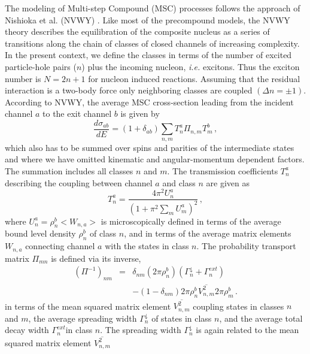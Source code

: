 \documentclass[twocolumn,amsmath,amssymb,10pt,groupedaddress,a4paper]{revtex4}
\begin{document}
The modeling of Multi-step Compound (MSC)
processes follows the approach of Nishioka et al. (NVWY)
\cite{NVWY}. Like most of the precompound models, the NVWY theory
describes the equilibration of the composite nucleus as a series of
transitions along the chain of classes of closed channels of increasing
complexity. In the present context, we define the classes in terms
of the number of excited particle-hole pairs ($n$) plus the incoming
nucleon, {\it i.e.} excitons. Thus the exciton number is $N=2n+1$ for nucleon
induced reactions. Assuming that the residual interaction is a two-body
force only neighboring classes are coupled $(\Delta n=\pm1)$.
According to NVWY, the average MSC cross-section
leading from the incident channel $a$ to the exit channel $b$ is
given by
\begin{equation}
\frac{d\sigma_{ab}}{dE}=(1+\delta_{ab})\sum_{n,m}T_{n}^{a}\Pi_{n,m}T_{m}^{b}\,,
\label{msccs}
\end{equation}
which also has to be summed over spins and parities of the intermediate
states and where we have omitted kinematic and angular-momentum dependent
factors. The summation includes all classes $n$ and $m$. The transmission
coefficients $T_{n}^{a}$ describing the coupling between channel
$a$ and class $n$ are given as
\begin{equation}
T_{n}^{a}=\frac{4\pi^{2}U_{n}^{a}}{\left(1+\pi^{2}\sum_{m}U_{m}^{a}\right)^{2}}\,,
\label{TlMSC}
\end{equation}
\noindent where $U_{n}^{a}=\rho_{n}^{b}<W_{n,a}>$ is microscopically defined
in terms of the average bound level density
$\rho_{n}^{b}$ of class $n$, and in terms of the average matrix
elements $W_{n,a}$ connecting channel $a$ with the states in class
$n$. The probability transport matrix $\Pi_{mn}$ is defined via
its inverse,
\begin{eqnarray}
(\Pi^{-1})_{nm}&=&\delta_{nm}(2\pi\rho_{n}^{b})(\Gamma_{n}^{\downarrow}+\Gamma_{n}^{ext})\nonumber\\
&&-(1-\delta_{nm})2\pi\rho_{n}^{b}\overline{V_{n,m}^{2}}2\pi\rho_{m}^{b}\,.\label{Pi}
\end{eqnarray}
in terms of the mean squared matrix element $\overline{V_{n,m}^{2}}$
coupling states in classes $n$ and $m$, the average spreading width
$\Gamma_{n}^{\downarrow}$ of states in class $n$, and the average
total decay width $\Gamma_{n}^{ext}$in class $n$. The spreading
width $\Gamma_{n}^{\downarrow}$ is again related to the mean squared
matrix element $\overline{V_{n,m}^{2}}$
\end{document}
